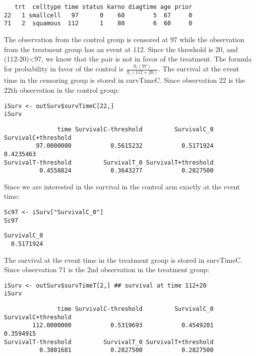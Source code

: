 \documentclass[12pt]{article}
\begin{document}
\begin{verbatim}
   trt  celltype time status karno diagtime age prior
22   1 smallcell   97      0    60        5  67     0
71   2  squamous  112      1    80        6  60     0
\end{verbatim}

The observation from the control group is censored at 97 while the
observation from the treatment group has an event at 112. Since the
threshold is 20, and (112-20)<97, we know that the pair is not in
favor of the treatment. The formula for probability in favor of the
control is \(\frac{S_c(97)}{S_c(112+20)}\). The survival at the event
time in the censoring group is stored in survTimeC. Since observation
22 is the 22th observation in the control group:
\lstset{language=r,label= ,caption= ,captionpos=b,numbers=none}
\begin{lstlisting}
iSurv <- outSurv$survTimeC[22,] 
iSurv
\end{lstlisting}

\begin{verbatim}
               time SurvivalC-threshold         SurvivalC_0 SurvivalC+threshold 
         97.0000000           0.5615232           0.5171924           0.4235463 
SurvivalT-threshold         SurvivalT_0 SurvivalT+threshold 
          0.4558824           0.3643277           0.2827500
\end{verbatim}

Since we are interested in the survival in the control arm exactly at the event time:
\lstset{language=r,label= ,caption= ,captionpos=b,numbers=none}
\begin{lstlisting}
Sc97 <- iSurv["SurvivalC_0"] 
Sc97
\end{lstlisting}

\begin{verbatim}
SurvivalC_0 
  0.5171924
\end{verbatim}

The survival at the event time in the treatment group is stored in
survTimeC. Since observation 71 is the 2nd observation in the treatment
group:
\lstset{language=r,label= ,caption= ,captionpos=b,numbers=none}
\begin{lstlisting}
iSurv <- outSurv$survTimeT[2,] ## survival at time 112+20
iSurv
\end{lstlisting}

\begin{verbatim}
               time SurvivalC-threshold         SurvivalC_0 SurvivalC+threshold 
        112.0000000           0.5319693           0.4549201           0.3594915 
SurvivalT-threshold         SurvivalT_0 SurvivalT+threshold 
          0.3801681           0.2827500           0.2827500
\end{verbatim}
\end{document}
